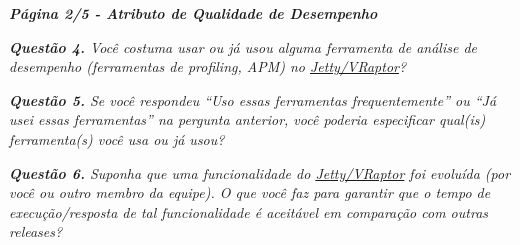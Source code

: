 \begin{framed}
	\noindent \textit{\textbf{Página 2/5 - Atributo de Qualidade de Desempenho}}
	\par
	\noindent \textit{\textbf{Questão 4.} Você costuma usar ou já usou alguma ferramenta de análise de desempenho (ferramentas de profiling, APM) no \underline{Jetty/VRaptor}?}
	\par
	\noindent \textit{\textbf{Questão 5.} Se você respondeu ``Uso essas ferramentas frequentemente'' ou ``Já usei essas ferramentas'' na pergunta anterior, você poderia especificar qual(is) ferramenta(s) você usa ou já usou?}
	\par
	\noindent \textit{\textbf{Questão 6.} Suponha que uma funcionalidade do \underline{Jetty/VRaptor} foi evoluída (por você ou outro membro da equipe). O que você faz para garantir que o tempo de execução/resposta de tal funcionalidade é aceitável em comparação com outras releases?}
\end{framed}

